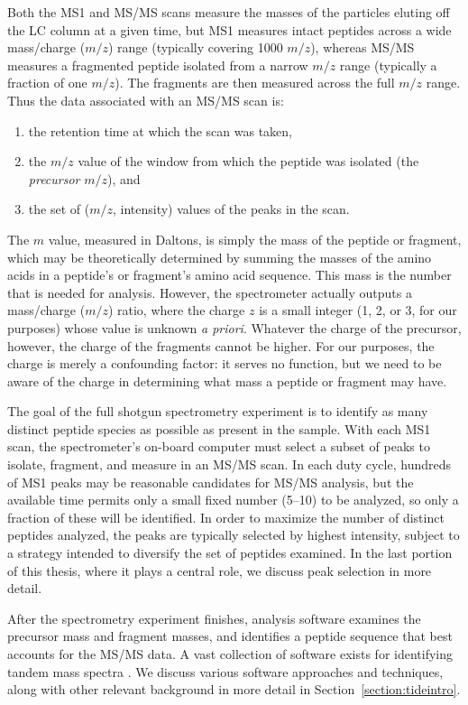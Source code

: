 \documentclass[12pt,twoside,openright]{report}
\begin{document}
Both the MS1 and MS/MS scans measure the masses of the particles eluting off the
LC column at a given time, but MS1 measures intact peptides across a wide
mass/charge ($m/z$) range (typically covering 1000 $m/z$), whereas MS/MS
measures a fragmented peptide isolated from a narrow $m/z$ range (typically a
fraction of one $m/z$). The fragments are then measured across the full $m/z$
range. Thus the data associated with an MS/MS scan is:
\begin{enumerate}
\item the retention time at which the scan was taken,
\item the $m/z$ value of the window from which the peptide was isolated (the
  {\it precursor} $m/z$), and
\item the set of ($m/z$, intensity) values of the peaks in the scan.
\end{enumerate}

The $m$ value, measured in Daltons, is simply the mass of the peptide or
fragment, which may be theoretically determined by summing the masses of the
amino acids in a peptide's or fragment's amino acid sequence. This mass is the
number that is needed for analysis. However, the spectrometer actually outputs a
mass/charge ($m/z$) ratio, where the charge $z$ is a small integer (1, 2, or 3,
for our purposes) whose value is unknown {\it a priori}. Whatever the charge of
the precursor, however, the charge of the fragments cannot be higher. For our
purposes, the charge is merely a confounding factor: it serves no function, but
we need to be aware of the charge in determining what mass a peptide or fragment
may have.

The goal of the full shotgun spectrometry experiment is to identify as many
distinct peptide species as possible as present in the sample. With each MS1
scan, the spectrometer's on-board computer must select a subset of peaks to
isolate, fragment, and measure in an MS/MS scan. In each duty cycle, hundreds of
MS1 peaks may be reasonable candidates for MS/MS analysis, but the available
time permits only a small fixed number (5--10) to be analyzed, so only a
fraction of these will be identified. In order to maximize the number of
distinct peptides analyzed, the peaks are typically selected by highest
intensity, subject to a strategy intended to diversify the set of peptides
examined. In the last portion of this thesis, where it plays a central role, we
discuss peak selection in more detail.

After the spectrometry experiment finishes, analysis software examines the
precursor mass and fragment masses, and identifies a peptide sequence that best
accounts for the MS/MS data. A vast collection of software exists for
identifying tandem mass spectra \cite{nesvizhskii:analysis}. We discuss various
software approaches and techniques, along with other relevant background in more
detail in Section~\ref{section:tideintro}.
\end{document}
